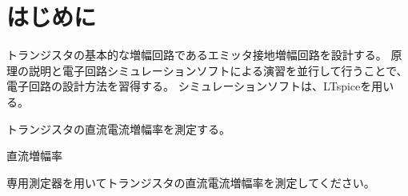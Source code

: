 \section{はじめに}
トランジスタの基本的な増幅回路であるエミッタ接地増幅回路を設計する。
原理の説明と電子回路シミュレーションソフトによる演習を並行して行うことで、電子回路の設計方法を習得する。
シミュレーションソフトは、LTspiceを用いる。

\begin{description}
  \setlength{\parskip}{0cm} %
  \setlength{\itemsep}{0cm} %
  \item[ゴール] トランジスタの直流電流増幅率を測定する。
  \item[キーワード] 直流増幅率
\end{description}

\begin{description}
  \setlength{\parskip}{0cm} %
  \setlength{\itemsep}{0cm} %
  \item[課題1] 専用測定器を用いてトランジスタの直流電流増幅率を測定してください。
\end{description}